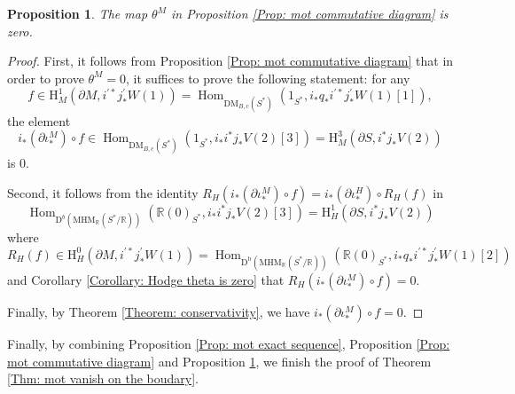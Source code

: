 \documentclass[11pt, a4paper]{amsart}
\theoremstyle{plain}
\newtheorem{proposition}[theorem]{Proposition}
\theoremstyle{definition}
\numberwithin{equation}{section}
\def\RR{\mathbb{R}}
\DeclareMathOperator{\Hom}{Hom}
\begin{document}
\begin{proposition}
\label{Prop: mot theta is zero}
    The map $\theta^{M}$ in Proposition \ref{Prop: mot commutative diagram} is zero. 
\end{proposition}
\begin{proof}
    First, it follows from Proposition \ref{Prop: mot commutative diagram} that in order to prove $\theta^{M} = 0$, it suffices to prove the following statement: 
    for any 
    \begin{equation*}
        f \in \mathrm{H}^{1}_{M}(\partial M, i^{\prime*}j^{\prime }_{*}W(1)) = \Hom_{\mathrm{DM}_{B,c}(S^{*})}(1_{S^{*}}, i_{*}q_{*}i^{\prime*}j^{\prime}_{*}W(1)[1]), 
    \end{equation*}
    the element 
    \begin{equation*}
        i_{*} (\partial \iota_{*}^{M}) \circ f \in \Hom_{\mathrm{DM}_{B,c}(S^{*})}(1_{S^{*}}, i_{*}i^{*}j_{*}V(2)[3]) = \mathrm{H}^{3}_{M}(\partial S, i^{*}j_{*}V(2))
    \end{equation*}
    is $0$. 
    \par Second, it follows from the identity $R_{H}(i_{*} (\partial \iota_{*}^{M}) \circ f) = i_{*} (\partial \iota_{*}^{H}) \circ R_{H}(f)$ in
    \begin{equation*}
        \Hom_{\mathrm{D}^{b}(\mathrm{MHM}_{\RR}(S^{*}/\RR))}(\RR(0)_{S^{*}}, i_{*}i^{*}j_{*}V(2)[3]) = \mathrm{H}^{1}_{H}(\partial S, i^{*}j_{*}V(2))
    \end{equation*}
    where 
    \begin{equation*}
        R_{H}(f) \in \mathrm{H}^{0}_{H}(\partial M, i^{\prime*}j^{\prime }_{*}W(1)) = \Hom_{\mathrm{D}^{\mathrm{b}}(\mathrm{MHM}_{\RR}(S^{*}/\RR))}(\RR(0)_{S^{*}}, i_{*}q_{*}i^{\prime*}j^{\prime}_{*}W(1)[2])
    \end{equation*}
    and Corollary \ref{Corollary: Hodge theta is zero} that $R_{H}(i_{*} (\partial \iota_{*}^{M}) \circ f) = 0$. 
    \par Finally, by Theorem \ref{Theorem: conservativity}, we have $i_{*} (\partial \iota_{*}^{M}) \circ f = 0$. 
\end{proof}

Finally, by combining Proposition \ref{Prop: mot exact sequence}, Proposition \ref{Prop: mot commutative diagram} and Proposition \ref{Prop: mot theta is zero}, we finish the proof of Theorem \ref{Thm: mot vanish on the boudary}.
\end{document}
